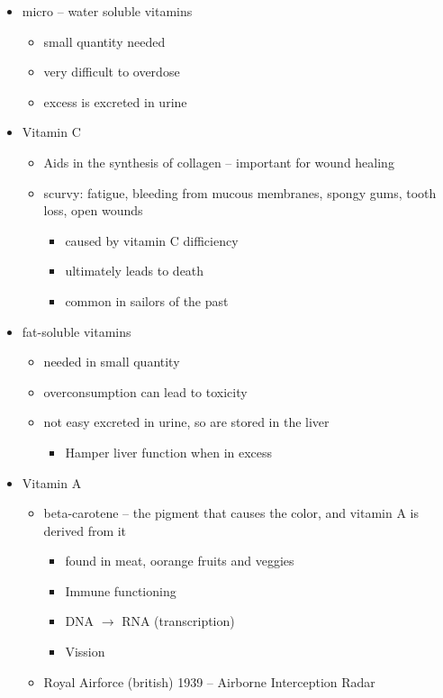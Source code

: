 \documentclass{article}
\theoremstyle{definition}
\begin{document}
\begin{itemize}
	\item micro -- water soluble vitamins
		\begin{itemize}
			\item small quantity needed
			\item very difficult to overdose
			\item excess is excreted in urine
		\end{itemize}
	\item Vitamin C
		\begin{itemize}
			\item Aids in the synthesis of collagen -- important for wound healing
			\item scurvy: fatigue, bleeding from mucous membranes, spongy gums, tooth loss, open wounds
				\begin{itemize}
					\item caused by vitamin C difficiency
					\item ultimately leads to death
					\item common in sailors of the past
				\end{itemize}
		\end{itemize}
	\item fat-soluble vitamins
		\begin{itemize}
			\item needed in small quantity
			\item overconsumption can lead to toxicity
			\item not easy excreted in urine, so are stored in the liver
				\begin{itemize}
					\item Hamper liver function when in excess
				\end{itemize}
		\end{itemize}
	\item Vitamin A
		\begin{itemize}
			\item beta-carotene -- the pigment that causes the color, and vitamin A is derived from it
				\begin{itemize}
					\item found in meat, oorange fruits and veggies
					\item Immune functioning
					\item DNA $\to$ RNA (transcription)
					\item Vission
				\end{itemize}
			\item Royal Airforce (british) 1939 -- Airborne Interception Radar

\end{itemize}
\end{itemize}
\end{document}
